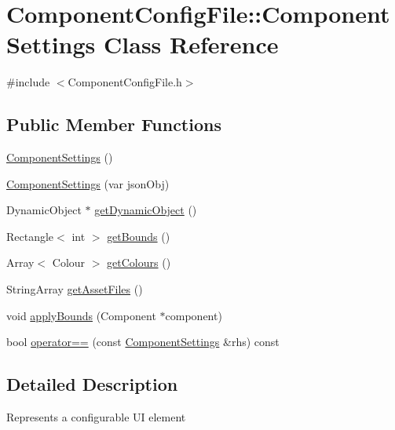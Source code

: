 \hypertarget{classComponentConfigFile_1_1ComponentSettings}{}\section{Component\+Config\+File\+:\+:Component\+Settings Class Reference}
\label{classComponentConfigFile_1_1ComponentSettings}


{\ttfamily \#include $<$Component\+Config\+File.\+h$>$}

\subsection*{Public Member Functions}
\begin{DoxyCompactItemize}
\item 
\mbox{\hyperlink{classComponentConfigFile_1_1ComponentSettings_a1f9063d2da0363a5597bb21dd455bcbb}{Component\+Settings}} ()
\item 
\mbox{\hyperlink{classComponentConfigFile_1_1ComponentSettings_a1347469edce1f9a2d19013a99578ac15}{Component\+Settings}} (var json\+Obj)
\item 
Dynamic\+Object $\ast$ \mbox{\hyperlink{classComponentConfigFile_1_1ComponentSettings_afa44a2c6847ffe9e49efde041e37a47b}{get\+Dynamic\+Object}} ()
\item 
Rectangle$<$ int $>$ \mbox{\hyperlink{classComponentConfigFile_1_1ComponentSettings_a3174b0e93997472d8bed0c51d4b410e0}{get\+Bounds}} ()
\item 
Array$<$ Colour $>$ \mbox{\hyperlink{classComponentConfigFile_1_1ComponentSettings_a3434a31b215dfa2b9cdb061f435b576c}{get\+Colours}} ()
\item 
String\+Array \mbox{\hyperlink{classComponentConfigFile_1_1ComponentSettings_a521f3f94e8f88b34938ced6ada06fe1a}{get\+Asset\+Files}} ()
\item 
void \mbox{\hyperlink{classComponentConfigFile_1_1ComponentSettings_a0cf1042210499222f2a4c67b9dcdb64b}{apply\+Bounds}} (Component $\ast$component)
\item 
bool \mbox{\hyperlink{classComponentConfigFile_1_1ComponentSettings_a9c9d74155182454351e984bff97b490a}{operator==}} (const \mbox{\hyperlink{classComponentConfigFile_1_1ComponentSettings}{Component\+Settings}} \&rhs) const
\end{DoxyCompactItemize}


\subsection{Detailed Description}
Represents a configurable UI element 


